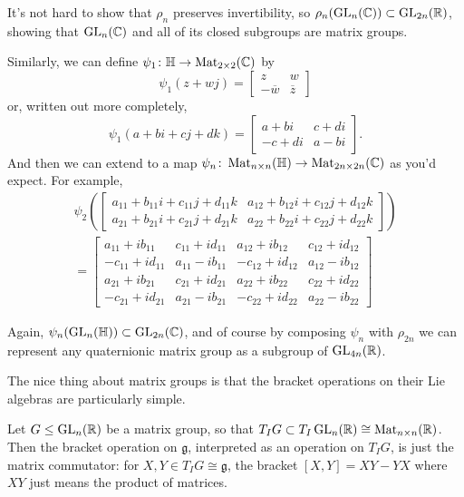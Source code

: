 It's not hard to show that $\rho_n$ preserves invertibility, so $\rho_n(\operatorname{GL}_n(\mathbb{C})) \subset \operatorname{GL}_{2n}(\mathbb{R})$, showing that $\operatorname{GL}_n(\mathbb{C})$ and all of its closed subgroups are matrix groups.

Similarly, we can define $\psi_1 \colon\thinspace\! \mathbb{H} \to \operatorname{Mat}_{2 \times 2}(\mathbb{C})$ by
\[
	\psi_1(z + wj) = \begin{bmatrix} z & w \\ -\overline{w} & \overline{z} \end{bmatrix}
\]
or, written out more completely,
\[
	\psi_1(a+bi+cj+dk) = \begin{bmatrix} a + bi & c + di \\ -c+di & a-bi \end{bmatrix}.
\]
And then we can extend to a map $\psi_n \colon\thinspace\! \operatorname{Mat}_{n \times n}(\mathbb{H}) \to \operatorname{Mat}_{2n \times 2n}(\mathbb{C})$ as you'd expect. For example,
\begin{multline*}
	\psi_2\left( \begin{bmatrix} a_{11} + b_{11}i + c_{11}j + d_{11}k & a_{12} + b_{12}i + c_{12}j + d_{12}k \\ a_{21} + b_{21}i + c_{21}j + d_{21}k  & a_{22} + b_{22}i + c_{22}j + d_{22}k  \end{bmatrix}\right) \\
	= \begin{bmatrix} a_{11}+i b_{11} & c_{11}+i d_{11} & a_{12}+i b_{12} & c_{12}+i d_{12} \\
 -c_{11}+i d_{11} & a_{11}-i b_{11} & -c_{12}+i d_{12} & a_{12}-i b_{12} \\
 a_{21}+i b_{21} & c_{21}+i d_{21} & a_{22}+i b_{22} & c_{22}+i d_{22} \\
 -c_{21}+i d_{21} & a_{21}-i b_{21} & -c_{22}+i d_{22} & a_{22}-i b_{22} \end{bmatrix}
\end{multline*}

Again, $\psi_n(\operatorname{GL}_n(\mathbb{H})) \subset \operatorname{GL}_{2n}(\mathbb{C})$, and of course by composing $\psi_n$ with $\rho_{2n}$ we can represent any quaternionic matrix group as a subgroup of $\operatorname{GL}_{4n}(\mathbb{R})$.

The nice thing about matrix groups is that the bracket operations on their Lie algebras are particularly simple.

\begin{proposition}\label{prop:matrix group commutator}
	Let $G \leq \operatorname{GL}_n(\mathbb{R})$ be a matrix group, so that $T_IG \subset T_I \operatorname{GL}_n(\mathbb{R}) \cong \operatorname{Mat}_{n \times n}(\mathbb{R})$. Then the bracket operation on $\mathfrak{g}$, interpreted as an operation on $T_IG$, is just the matrix commutator: for $X,Y \in T_IG \cong \mathfrak{g}$, the bracket $[X,Y] = XY-YX$ where $XY$ just means the product of matrices.
\end{proposition}

